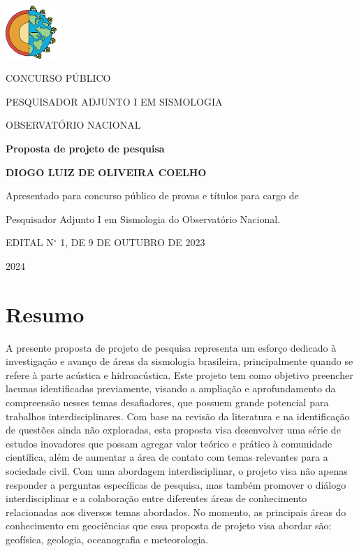 \documentclass[10pt,a4paper,oneside]{book}
\newcommand{\Year}{2024}
\newcommand{\Author}{Diogo Luiz de Oliveira Coelho}
\begin{document}
\pagestyle{plain}
\frontmatter

\begin{titlepage}
  \begin{center}
    \includegraphics[height=2cm]{images/logo_terra.png}
    \vspace{1cm}

    CONCURSO PÚBLICO
    
    PESQUISADOR ADJUNTO I EM SISMOLOGIA
    
    OBSERVATÓRIO NACIONAL

    \vspace{5cm}

    \textbf{\LARGE Proposta de projeto de pesquisa}
    \vspace{1cm}

    \textbf{\LARGE \MakeUppercase{\Author{}}}
    \vspace{5cm}

    {\small
	Apresentado para concurso público de provas e títulos para cargo de

	Pesquisador Adjunto I em Sismologia do Observatório Nacional.
      \vspace{1cm}

	EDITAL N$^{\circ}$   1, DE 9 DE OUTUBRO DE 2023
    }
    \vfill

    \Year{}
  \end{center}
\end{titlepage}

\chapter*{Resumo}

A presente proposta de projeto de pesquisa representa um esforço dedicado à investigação e avanço de áreas da sismologia brasileira, principalmente quando se refere à parte acústica e hidroacústica. Este projeto tem como objetivo preencher lacunas identificadas previamente, visando a ampliação e aprofundamento da compreensão nesses temas desafiadores, que possuem grande potencial para trabalhos interdisciplinares. Com base na revisão da literatura e na identificação de questões ainda não exploradas, esta proposta visa desenvolver uma série de estudos inovadores que possam agregar valor teórico e prático à comunidade científica, além de aumentar a área de contato com temas relevantes para a sociedade civil. Com uma abordagem interdisciplinar, o projeto visa não apenas responder a perguntas específicas de pesquisa, mas também promover o diálogo interdisciplinar e a colaboração entre diferentes áreas de conhecimento relacionadas aos diversos temas abordados. No momento, as principais áreas do conhecimento em geociências que essa proposta de projeto visa abordar são: geofísica, geologia, oceanografia e meteorologia.  
\end{document}
